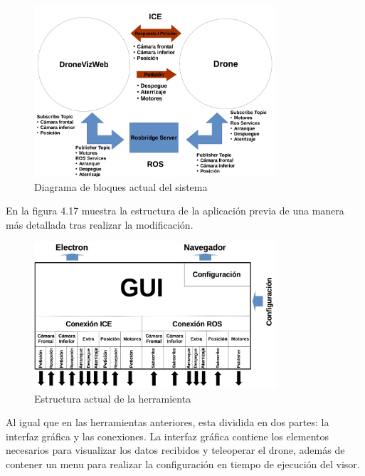 \begin{figure}[H]
  \begin{center}
    \includegraphics[width=0.8\textwidth]{figures/DroneViz2.png}
		\caption{Diagrama de bloques actual del sistema}
		\label{fig.esquemaTurtleBot2}
		\end{center}
\end{figure}

En la figura 4.17 muestra la estructura de la aplicación previa de una manera más detallada tras realizar la modificación.

\begin{figure}[H]
  \begin{center}
    \includegraphics[width=0.8\textwidth]{figures/estrucuturadroneviz2.png}
		\caption{Estructura actual de la herramienta}
		\label{fig.estructuracamviz2}
		\end{center}
\end{figure}

Al igual que en las herramientas anteriores, esta dividida en dos partes: la interfaz gráfica y las conexiones. La interfaz gráfica contiene los elementos necesarios para visualizar los datos recibidos y teleoperar el drone, además de contener un menu para realizar la configuración en tiempo de ejecución del visor.

